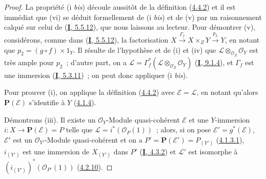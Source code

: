 \begin{proof}
La propriété (i \emph{bis}) découle aussitôt de la définition
(\hyperref[II.4.4.2-fr]{4.4.2}) et il est immédiat que (vi) se déduit
formellement de (i \emph{bis}) et de (v) par un raisonnement calqué sur celui de
(\hyperref[I.5.5.12-fr]{\textbf{I}, 5.5.12}), que nous laissons au lecteur. Pour
démontrer (v), considérons, comme dans
(\hyperref[I.5.5.12-fr]{\textbf{I}, 5.5.12}), la factorisation
$X\xrightarrow{\Gamma_f}X\times_ZY\xrightarrow{p_2}Y$, en notant que
$p_2=(g\circ f)\times1_Y$. Il résulte de l'hypothèse et de (i) et (iv) que
$\mathcal{L}\otimes_{\mathcal{O}_Z}\mathcal{O}_Y$ est très ample pour $p_2$~;
d'autre part, on a
$\mathcal{L}=\Gamma_f^*(\mathcal{L}\otimes_{\mathcal{O}_Z}\mathcal{O}_Y)$
(\hyperref[I.9.1.4-fr]{\textbf{I}, 9.1.4}), et $\Gamma_f$ est une immersion
(\hyperref[I.5.3.11-fr]{\textbf{I}, 5.3.11})~; on peut donc appliquer (i \emph{bis}).


Pour prouver (i), on applique la définition
(\hyperref[II.4.4.2-fr]{4.4.2}) avec $\mathcal{E}=\mathcal{L}$, en notant
qu'alors $\mathbf{P}(\mathcal{E})$ s'identifie à $Y$
(\hyperref[II.4.1.4-fr]{4.1.4}).

Démontrons (iii). Il existe un $\mathcal{O}_Y$-Module quasi-cohérent
$\mathcal{E}$ et une $Y$-immersion $i:X\to\mathbf{P}(\mathcal{E})=P$ telle
que $\mathcal{L}=i^*(\mathcal{O}_P(1))$~; alors, si on pose
$\mathcal{E}'=g^*(\mathcal{E})$, $\mathcal{E}'$ est un
$\mathcal{O}_{Y'}$-Module quasi-cohérent et on a
$P'=\mathbf{P}(\mathcal{E}')=P_{(Y')}$
(\hyperref[II.4.1.3.1-fr]{4.1.3.1}), $i_{(Y')}$ est une immersion de
$X_{(Y')}$ dans $P'$ (\hyperref[I.4.3.2-fr]{\textbf{I}, 4.3.2}) et $\mathcal{L}'$ est
isomorphe à $(i_{(Y')})^*(\mathcal{O}_{P'}(1))$
(\hyperref[II.4.2.10-fr]{4.2.10}).


\end{proof}
